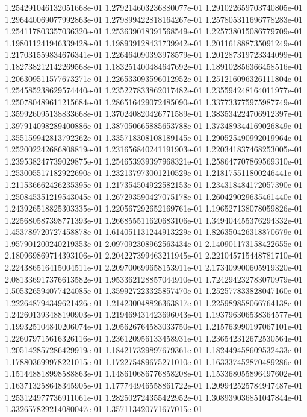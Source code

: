 1.254291046132051668e-01
1.279214603236880077e-01
1.291022659703740805e-01
1.296440069077992863e-01
1.279899422818164267e-01
1.257805311696778283e-01
1.254117803357036320e-01
1.253639018391568549e-01
1.225738015086779709e-01
1.198011241946339428e-01
1.198939128431739942e-01
1.201161888735091249e-01
1.217031559834676341e-01
1.226464090393978579e-01
1.201287319723344099e-01
1.182738212142269568e-01
1.183251400484647692e-01
1.189102856366458516e-01
1.206309511577673271e-01
1.226533093596012952e-01
1.251216096326111804e-01
1.254585238629574440e-01
1.235227833862017482e-01
1.235594248164011977e-01
1.250780489611215684e-01
1.286516429072485090e-01
1.337733775975987749e-01
1.359926095138833668e-01
1.370240820426771589e-01
1.383534224706912397e-01
1.397914098289400886e-01
1.387050665885653788e-01
1.373489344169026849e-01
1.355159942813792262e-01
1.335718308108189145e-01
1.290525490992019964e-01
1.252002242686808819e-01
1.231656840241191903e-01
1.220341837468253005e-01
1.239538247739029875e-01
1.254653939397968321e-01
1.258647707869569310e-01
1.253005517182922690e-01
1.232137973001210529e-01
1.218175511800246441e-01
1.211536662426235395e-01
1.217354504922582153e-01
1.234318484172057390e-01
1.250845351219543045e-01
1.267293590427075178e-01
1.260429029635461440e-01
1.243926518825303335e-01
1.220567292652169761e-01
1.196527138078059826e-01
1.225680587398771393e-01
1.266855511620683106e-01
1.349404455376294332e-01
1.453789720727458878e-01
1.614051131244913229e-01
1.826350426318870679e-01
1.957901200240219353e-01
2.097092308962563434e-01
2.140901173158422655e-01
2.180969869714393106e-01
2.204227399463211945e-01
2.221045715448781710e-01
2.224386516415004511e-01
2.209700699658153911e-01
2.173409900605919320e-01
2.081336917376613582e-01
1.953362128857044910e-01
1.724294232783070979e-01
1.505326594077424085e-01
1.359927223325857470e-01
1.252577833828047160e-01
1.222648794349621426e-01
1.214230048826363817e-01
1.225989858066764138e-01
1.242601393488190903e-01
1.219469431423696043e-01
1.193796306538364577e-01
1.199325104840206074e-01
1.205626764583033750e-01
1.215763990197067101e-01
1.226079715616326116e-01
1.236120956133458931e-01
1.236542312672530564e-01
1.205142857286429919e-01
1.184217329897679361e-01
1.182449458609532433e-01
1.178803699978221015e-01
1.172275489675271010e-01
1.163337452870489286e-01
1.151448818998588863e-01
1.148610686776858208e-01
1.153368055896497602e-01
1.163713258648345905e-01
1.177744946558861722e-01
1.209942525784947487e-01
1.253124977736911061e-01
1.282502724355422952e-01
1.308939036851047844e-01
1.332657829214080047e-01
1.357113420771677015e-01
